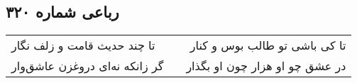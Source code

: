 \begin{center}
\section*{رباعی شماره ۳۲۰}
\label{sec:sh320}
\begin{longtable}{l p{0.5cm} r}
تا چند حدیث قامت و زلف نگار
&&
تا کی باشی تو طالب بوس و کنار
\\
گر زانکه نه‌ای دروغزن عاشق‌وار
&&
در عشق چو او هزار چون او بگذار
\\
\end{longtable}
\end{center}

